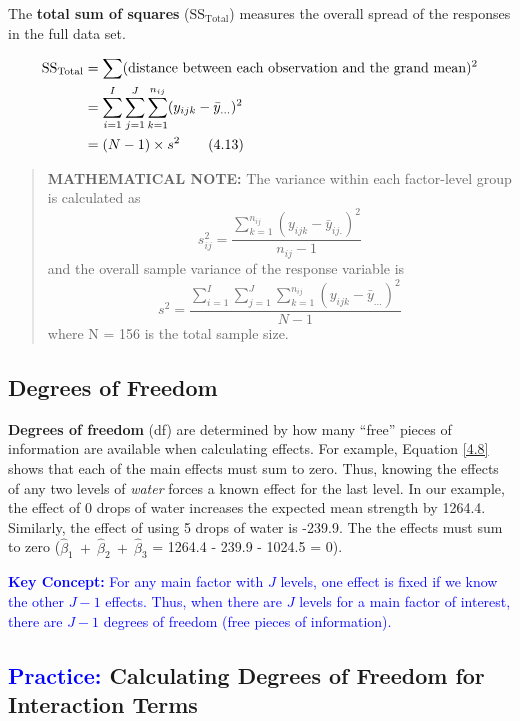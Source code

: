 \documentclass[
]{report}
\begin{document}
The \textbf{total sum of squares} (\(\scriptstyle \text{SS}_{\text{Total}}\)) measures the overall spread of the responses in the full data set.

\begin{align}\label{4.13}
\text{SS}_{\text{Total}} &= \sum (\text{distance between each observation and the grand mean})^2 \notag \\
&= \sum_{i=1}^{I} \sum_{j=1}^{J} \sum_{k=1}^{n_{ij}} (y_{ijk} - \bar{y}_{...})^2 \notag \\
&= (N-1) \times s^2
\tag{4.13}
\end{align}

\begin{quote}
\textbf{MATHEMATICAL NOTE:}
The variance within each factor-level group is calculated as
\[
s_{ij}^2 = \frac{\sum_{k=1}^{n_{ij}} (y_{ijk} - \bar{y}_{ij.})^2}{n_{ij} - 1}
\]
and the overall sample variance of the response variable is
\[
s^2 = \frac{\sum_{i=1}^{I} \sum_{j=1}^{J} \sum_{k=1}^{n_{ij}} (y_{ijk} - \bar{y}_{...})^2}{N-1}
\]
where N = 156 is the total sample size.
\end{quote}

\hypertarget{degrees-of-freedom}{%
\subsection*{Degrees of Freedom}\label{degrees-of-freedom}}

\textbf{Degrees of freedom} (df) are determined by how many ``free'' pieces of information are available when calculating effects. For example, Equation \ref{4.8} shows that each of the main effects must sum to zero. Thus, knowing the effects of any two levels of \emph{water} forces a known effect for the last level. In our example, the effect of 0 drops of water increases the expected mean strength by 1264.4. Similarly, the effect of using 5 drops of water is -239.9. The the effects must sum to zero (\(\scriptstyle \hat{\beta}_1 \ +\  \hat{\beta}_2 \ +\  \hat{\beta}_3\) = 1264.4 - 239.9 - 1024.5 = 0).

\textbf{\textcolor{blue}{Key Concept:}} \textcolor{blue}{For any main factor with $\scriptstyle J$ levels, one effect is fixed if we know the other $\scriptstyle J-1$ effects. Thus, when there are $\scriptstyle J$ levels for a main factor of interest, there are $\scriptstyle J-1$ degrees of freedom (free pieces of information).}

\hypertarget{calculating-degrees-of-freedom-for-interaction-terms}{%
\subsection*{\texorpdfstring{\textcolor{blue}{Practice:} Calculating Degrees of Freedom for Interaction Terms}{ Calculating Degrees of Freedom for Interaction Terms}}\label{calculating-degrees-of-freedom-for-interaction-terms}}
\end{document}
